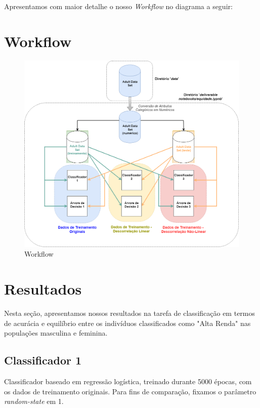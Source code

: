 \documentclass[11pt]{article}
\makeatletter
\def\maxwidth{\ifdim\Gin@nat@width>\linewidth\linewidth
    \else\Gin@nat@width\fi}
\let\Oldincludegraphics\includegraphics
\renewcommand{\includegraphics}[1]{\Oldincludegraphics[width=.8\maxwidth]{#1}}
\makeatother
\begin{document}
Apresentamos com maior detalhe o nosso \emph{Workflow} no diagrama a
seguir:

    \section{Workflow}\label{workflow}

\begin{figure}
\centering
\includegraphics{../fig/WorkflowIA369.png}
\caption{Workflow}
\end{figure}

    \section{Resultados}\label{resultados}

Nesta seção, apresentamos nossos resultados na tarefa de classificação
em termos de acurácia e equilíbrio entre os indivíduos classificados
como "Alta Renda" nas populações masculina e feminina.

    \subsection{Classificador 1}\label{classificador-1}

Classificador baseado em regressão logística, treinado durante 5000
épocas, com os dados de treinamento originais. Para fins de comparação,
fixamos o parâmetro \emph{random-state} em 1.
\end{document}
